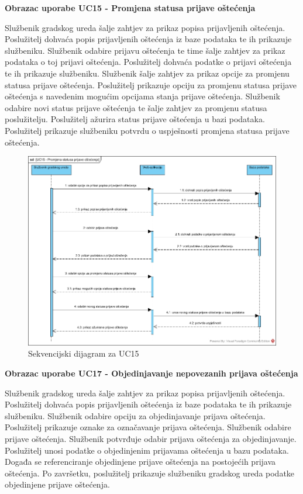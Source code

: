 \noindent \textbf{Obrazac uporabe UC15 - Promjena statusa prijave oštećenja}

Službenik gradskog ureda šalje zahtjev za prikaz popisa prijavljenih oštećenja. Poslužitelj dohvaća popis prijavljenih oštećenja iz baze 
podataka te ih prikazuje službeniku. Službenik odabire prijavu oštećenja te time šalje zahtjev za prikaz podataka o toj prijavi oštećenja. 
Poslužitelj dohvaća podatke o prijavi oštećenja te ih prikazuje službeniku. Službenik šalje zahtjev za prikaz opcije za promjenu statusa prijave
oštećenja. Poslužitelj prikazuje opciju za promjenu statusa prijave oštećenja s navedenim mogućim opcijama stanja prijave oštećenja. Službenik
odabire novi status prijave oštećenja te šalje zahtjev za promjenu statusa poslužitelju. Poslužitelj ažurira status prijave oštećenja u bazi
podataka. Poslužitelj prikazuje službeniku potvrdu o uspješnosti promjena statusa prijave oštećenja.

\begin{figure}[H]
	\includegraphics[scale=0.5]{slike/UC15_sekvencijski.jpg} %
	\centering
	\caption{Sekvencijski dijagram za UC15}
	\label{fig:SekvencijskiDijagramKreiranjePrijaveOštećenja}
\end{figure}

\noindent \textbf{Obrazac uporabe UC17 - Objedinjavanje nepovezanih prijava oštećenja}

Službenik gradskog ureda šalje zahtjev za prikaz popisa prijavljenih oštećenja. Poslužitelj dohvaća popis prijavljenih oštećenja iz baze 
podataka te ih prikazuje službeniku. Službenik odabire opciju za objedinjavanje prijava oštećenja. Poslužitelj prikazuje oznake za označavanje
prijava oštećenja. Službenik odabire prijave oštećenja. Službenik potvrđuje odabir prijava oštećenja za objedinjavanje. Poslužitelj unosi
podatke o objedinjenim prijavama oštećenja u bazu podataka. Događa se referenciranje objedinjene prijave oštećenja na postojećih prijava 
oštećenja. Po završetku, poslužitelj prikazuje službeniku gradskog ureda podatke objedinjene prijave oštećenja. 


